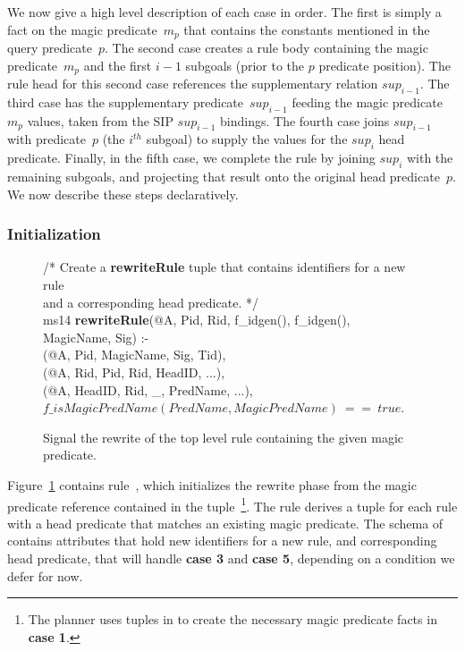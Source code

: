 We now give a high level description of each case in order.  The first is
simply a fact on the magic predicate~$m_p$ that contains the constants
mentioned in the query predicate~$p$.  The second case creates a rule body
containing the magic predicate~$m_p$ and the first $i-1$ subgoals (prior to the
$p$ predicate position).  The rule head for this second case references the
supplementary relation $sup_{i-1}$.  The third case has the supplementary
predicate~$sup_{i-1}$ feeding the magic predicate~$m_p$ values, taken from the
SIP $sup_{i-1}$ bindings.  The fourth case joins $sup_{i-1}$ with predicate~$p$
(the $i^{th}$ subgoal) to supply the values for the $sup_i$ head predicate.
Finally, in the fifth case, we complete the rule by joining $sup_i$ with the
remaining subgoals, and projecting that result onto the original head
predicate~$p$.  We now describe these steps declaratively.

\subsubsection{Initialization}

\begin{figure}[!t]
\ssp
\centering
\begin{boxedminipage}{\linewidth}
/* Create a {\bf rewriteRule} tuple that contains identifiers for a new rule \\
and a corresponding head predicate. */ \\
ms14 {\bf rewriteRule}(@A, Pid, Rid, f\_idgen(), f\_idgen(), MagicName, Sig) :- \\
(@A, Pid, MagicName, Sig, Tid), \\
(@A, Rid, Pid, Rid, HeadID, ...), \\
(@A, HeadID, Rid, \_, PredName, ...), \\
\datalogspace $f\_isMagicPredName(PredName, MagicPredName)\ ==\ true$. \\
\end{boxedminipage}
\caption{\label{ch:magic:fig:rewrite1} Signal the rewrite of the top level rule 
containing the given magic predicate.}
\end{figure}

Figure~\ref{ch:magic:fig:rewrite1} contains rule~, which initializes
the rewrite phase from the magic predicate reference contained in the
 tuple~\footnote{The planner uses tuples in
 to create the necessary magic predicate facts in {\bf case
1}.}.  The rule derives a  tuple for each rule with a head
predicate that matches an existing magic predicate.  The schema of
 contains attributes that hold new identifiers for a new
rule, and corresponding head predicate, that will handle {\bf case 3} and
{\bf case 5}, depending on a condition we defer for now.


